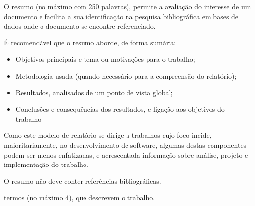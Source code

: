 O resumo (no máximo com 250 palavras), permite a avaliação do interesse de um documento e facilita a sua identificação na pesquisa bibliográfica em bases de dados onde o documento se encontre referenciado. 

É recomendável que o resumo aborde, de forma sumária:
\begin{itemize}
	\item Objetivos principais e tema ou motivações para o trabalho; 
	\item Metodologia usada (quando necessário para a compreensão do relatório); 
	\item Resultados, analisados de um ponto de vista global; 
	\item Conclusões e consequências dos resultados, e ligação aos objetivos do trabalho.
\end{itemize}

Como este modelo de relatório se dirige a trabalhos cujo foco incide, maioritariamente, no desenvolvimento de software, algumas destas componentes podem ser menos enfatizadas, e acrescentada informação sobre análise, projeto e implementação do trabalho.

O resumo não deve conter referências bibliográficas.

\mbox{}\linebreak
{} termos (no máximo 4), que descrevem o trabalho.
